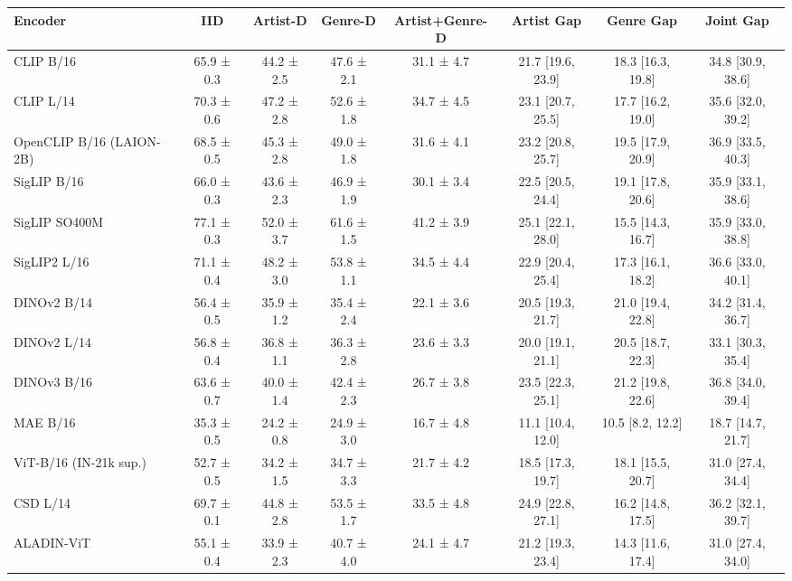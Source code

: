 \begin{tabular}{lccccccc}
\toprule
Encoder & IID & Artist-D & Genre-D & Artist+Genre-D & Artist Gap & Genre Gap & Joint Gap \\
\midrule
CLIP B/16 & 65.9 ± 0.3 & 44.2 ± 2.5 & 47.6 ± 2.1 & 31.1 ± 4.7 & 21.7 [19.6, 23.9] & 18.3 [16.3, 19.8] & 34.8 [30.9, 38.6] \\
CLIP L/14 & 70.3 ± 0.6 & 47.2 ± 2.8 & 52.6 ± 1.8 & 34.7 ± 4.5 & 23.1 [20.7, 25.5] & 17.7 [16.2, 19.0] & 35.6 [32.0, 39.2] \\
OpenCLIP B/16 (LAION-2B) & 68.5 ± 0.5 & 45.3 ± 2.8 & 49.0 ± 1.8 & 31.6 ± 4.1 & 23.2 [20.8, 25.7] & 19.5 [17.9, 20.9] & 36.9 [33.5, 40.3] \\
SigLIP B/16 & 66.0 ± 0.3 & 43.6 ± 2.3 & 46.9 ± 1.9 & 30.1 ± 3.4 & 22.5 [20.5, 24.4] & 19.1 [17.8, 20.6] & 35.9 [33.1, 38.6] \\
SigLIP SO400M & 77.1 ± 0.3 & 52.0 ± 3.7 & 61.6 ± 1.5 & 41.2 ± 3.9 & 25.1 [22.1, 28.0] & 15.5 [14.3, 16.7] & 35.9 [33.0, 38.8] \\
SigLIP2 L/16 & 71.1 ± 0.4 & 48.2 ± 3.0 & 53.8 ± 1.1 & 34.5 ± 4.4 & 22.9 [20.4, 25.4] & 17.3 [16.1, 18.2] & 36.6 [33.0, 40.1] \\
DINOv2 B/14 & 56.4 ± 0.5 & 35.9 ± 1.2 & 35.4 ± 2.4 & 22.1 ± 3.6 & 20.5 [19.3, 21.7] & 21.0 [19.4, 22.8] & 34.2 [31.4, 36.7] \\
DINOv2 L/14 & 56.8 ± 0.4 & 36.8 ± 1.1 & 36.3 ± 2.8 & 23.6 ± 3.3 & 20.0 [19.1, 21.1] & 20.5 [18.7, 22.3] & 33.1 [30.3, 35.4] \\
DINOv3 B/16 & 63.6 ± 0.7 & 40.0 ± 1.4 & 42.4 ± 2.3 & 26.7 ± 3.8 & 23.5 [22.3, 25.1] & 21.2 [19.8, 22.6] & 36.8 [34.0, 39.4] \\
MAE B/16 & 35.3 ± 0.5 & 24.2 ± 0.8 & 24.9 ± 3.0 & 16.7 ± 4.8 & 11.1 [10.4, 12.0] & 10.5 [8.2, 12.2] & 18.7 [14.7, 21.7] \\
ViT-B/16 (IN-21k sup.) & 52.7 ± 0.5 & 34.2 ± 1.5 & 34.7 ± 3.3 & 21.7 ± 4.2 & 18.5 [17.3, 19.7] & 18.1 [15.5, 20.7] & 31.0 [27.4, 34.4] \\
CSD L/14 & 69.7 ± 0.1 & 44.8 ± 2.8 & 53.5 ± 1.7 & 33.5 ± 4.8 & 24.9 [22.8, 27.1] & 16.2 [14.8, 17.5] & 36.2 [32.1, 39.7] \\
ALADIN-ViT & 55.1 ± 0.4 & 33.9 ± 2.3 & 40.7 ± 4.0 & 24.1 ± 4.7 & 21.2 [19.3, 23.4] & 14.3 [11.6, 17.4] & 31.0 [27.4, 34.0] \\
\bottomrule
\end{tabular}

